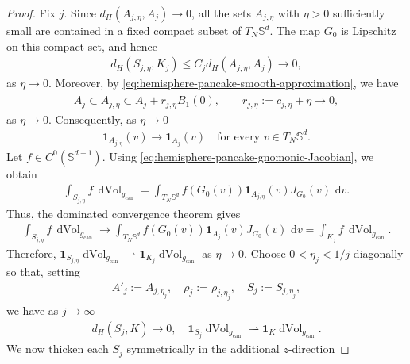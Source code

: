 \documentclass[10pt,a4paper]{amsart}
\def\bS {\mathbb{S}}
\newcommand{\can}{\mathrm{can}}
\newcommand{\dvol}{\operatorname{dVol}}
\newcommand{\ud}{\mathrm{\,d}}
\newcommand{\wto}{\rightharpoonup}
\begin{document}
\begin{proof}
Fix $j$. Since
$d_H(A_{j,\eta},A_j)\to0$, all the sets $A_{j,\eta}$ with $\eta>0$
sufficiently small are contained in a fixed compact subset of
$T_N\bS^d$. The map $G_0$ is Lipschitz on this compact set, and hence
\begin{align}
        d_H(S_{j,\eta},K_j)
        \leq
        C_jd_H(A_{j,\eta},A_j)
        \rightarrow
        0,
\end{align}
as $\eta\to 0$. Moreover, by
\eqref{eq:hemisphere-pancake-smooth-approximation}, we have
\begin{align}
        A_j
        \subset
        A_{j,\eta}
        \subset
        A_j+r_{j,\eta}\overline B_1(0),
        \qquad
        r_{j,\eta}
        :=
        c_{j,\eta}+\eta
        \rightarrow
        0,
\end{align}
as $\eta\to 0.$ Consequently, as $\eta \to 0$
\begin{align}
        \mathbf{1}_{A_{j,\eta}}(v)
        \rightarrow
        \mathbf{1}_{A_j}(v)
        \quad
        \text{for every }v\in T_N\bS^d.
\end{align}
Let $f\in C^0(\bS^{d+1})$. Using
\eqref{eq:hemisphere-pancake-gnomonic-Jacobian}, we obtain
\begin{align}
        \int_{S_{j,\eta}}f\,\dvol_{g_{\can}}
        =
        \int_{T_N\bS^d}
        f(G_0(v))
        \mathbf{1}_{A_{j,\eta}}(v)
        J_{G_0}(v)\,\ud v.
\end{align}
Thus, the dominated convergence theorem gives
\begin{align}
        \int_{S_{j,\eta}}f\,\dvol_{g_{\can}}
        \rightarrow
        \int_{T_N\bS^d}
        f(G_0(v))
        \mathbf{1}_{A_j}(v)
        J_{G_0}(v)\,\ud v
        =
        \int_{K_j}f\,\dvol_{g_{\can}}.
\end{align}
Therefore, $ \mathbf{1}_{S_{j,\eta}}\dvol_{g_{\can}} \wto \mathbf{1}_{K_j}\dvol_{g_{\can}}$ as $\eta \to 0$. Choose $0<\eta_j<1/j$ diagonally so that, setting
\begin{align}
        A'_j
        :=
        A_{j,\eta_j},
        \quad 
        \rho_j
        :=
        \rho_{j,\eta_j},
        \quad 
        S_j
        :=
        S_{j,\eta_j},
\end{align}
we have as $j\to \infty$
\begin{align}\label{eq:hemisphere-pancake-smooth-limit}
        d_H(S_j,K)
        \rightarrow
        0,
        \quad
        \mathbf{1}_{S_j}\dvol_{g_{\can}}
        \wto
        \mathbf{1}_K\dvol_{g_{\can}}.
\end{align}
We now thicken each $S_j$ symmetrically in the additional $z$-direction

\end{proof}
\end{document}
